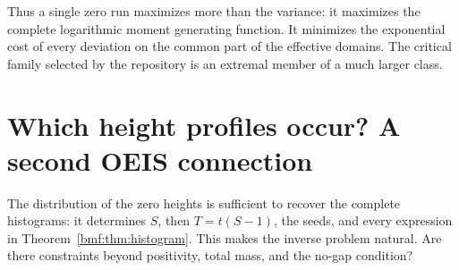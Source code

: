 \documentclass[11pt]{article}
\numberwithin{equation}{section}
\theoremstyle{definition}
\theoremstyle{remark}
\begin{document}
Thus a single zero run maximizes more than the variance: it
maximizes the complete logarithmic moment generating function.
It minimizes the exponential cost of every deviation on the
common part of the effective domains. The critical family selected
by the repository is an extremal member of a much larger class.

\section{Which height profiles occur? A second OEIS connection}
\label{bmf:sec:realization}

The distribution of the zero heights is sufficient to recover the
complete histograms: it determines $S$, then $T=t(S-1)$, the seeds,
and every expression in Theorem~\ref{bmf:thm:histogram}. This makes the
inverse problem natural. Are there constraints beyond positivity,
total mass, and the no-gap condition?
\end{document}
